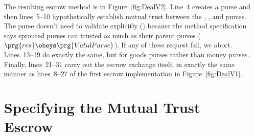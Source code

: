 The resulting escrow method is in
Figure~\ref{fig:DealV2}. Line~4 creates a 
purse and then lines~5--10 hypothetically establish mutual trust
between the , , and 
purses.   The  purse doesn't need to validate
  explicitly
() because the 
method specification says sprouted purses can trusted as much as their
parent purses ($\prg{res} \obeys \prg{ValidPurse}$). If any of these
 request fail, we abort.
Lines~13--19 do exactly the same, but for goods purses rather than
money purses.  Finally, lines~21--31 carry out the escrow exchange
itself, in exactly the same manner as lines~8--27 of the first escrow
implementation
in Figure~\ref{fig:DealV1}.

\section{Specifying the Mutual Trust Escrow}
\label{sec:VaildEscrow}


